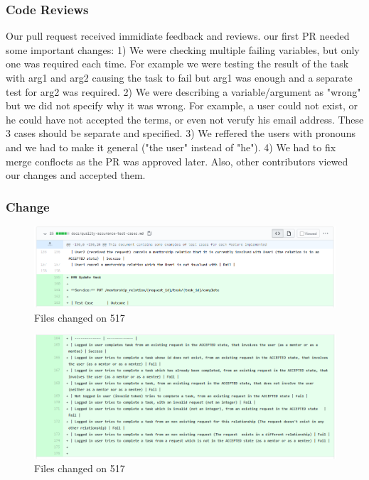 \documentclass{article}
\begin{document}
\subsubsection{Code Reviews}
\hspace{0.5cm}Our pull request received immidiate feedback and reviews. our first PR needed some important changes:
1) We were checking multiple failing variables, but only one was required each time. For example we were testing the result of the task with arg1 and arg2 causing the task to fail but arg1 was enough and a separate test for arg2 was required. 
2) We were describing a variable/argument as "wrong" but we did not specify why it was wrong. For example, a user could not exist, or he could have not accepted the terms, or even not verufy his email address. These 3 cases should be separate and specified.
3) We reffered the users with pronouns and we had to make it general ("the user" instead of "he").
4) We had to fix merge conflocts as the PR was approved later.
 Also, other contributors viewed our changes and accepted them. 
\subsubsection{Change}
\begin{figure}[tph!]
\centerline{\includegraphics[totalheight=7cm, width=16cm]{517Changes_1.png}}
    \caption{Files changed on 517}
    \label{fig:verticalcell}
\end{figure}
\begin{figure}[tph!]
\centerline{\includegraphics[totalheight=13cm, width=19cm]{517Changes_2.png}}
    \caption{Files changed on 517}
    \label{fig:verticalcell}
\end{figure}
\vfill
\clearpage
\end{document}
